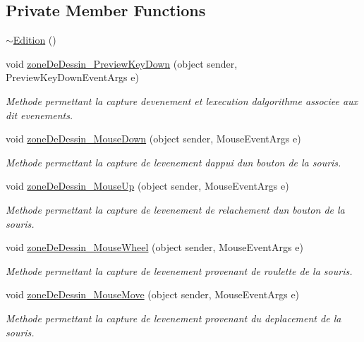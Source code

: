 \subsection*{Private Member Functions}
\begin{DoxyCompactItemize}
\item 
\hyperlink{group__inf2990_ga9d36af595cb96766209449c998fe42cd}{$\sim$\+Edition} ()
\item 
void \hyperlink{group__inf2990_ga994e6deaa6412757da4e495fb54c34bf}{zone\+De\+Dessin\+\_\+\+Preview\+Key\+Down} (object sender, Preview\+Key\+Down\+Event\+Args e)
\begin{DoxyCompactList}\small\item\em Methode permettant la capture d\textquotesingle{}evenement et l\textquotesingle{}execution d\textquotesingle{}algorithme associee aux dit evenements. \end{DoxyCompactList}\item 
void \hyperlink{group__inf2990_gaf28702ba0b8ace91adc0b787d679b482}{zone\+De\+Dessin\+\_\+\+Mouse\+Down} (object sender, Mouse\+Event\+Args e)
\begin{DoxyCompactList}\small\item\em Methode permettant la capture de l\textquotesingle{}evenement d\textquotesingle{}appui d\textquotesingle{}un bouton de la souris. \end{DoxyCompactList}\item 
void \hyperlink{group__inf2990_ga316904eb2e935ef2a5258e3a6bcfa572}{zone\+De\+Dessin\+\_\+\+Mouse\+Up} (object sender, Mouse\+Event\+Args e)
\begin{DoxyCompactList}\small\item\em Methode permettant la capture de l\textquotesingle{}evenement de relachement d\textquotesingle{}un bouton de la souris. \end{DoxyCompactList}\item 
void \hyperlink{group__inf2990_ga3a6b0beb5f842f149d46c6e85854d0b8}{zone\+De\+Dessin\+\_\+\+Mouse\+Wheel} (object sender, Mouse\+Event\+Args e)
\begin{DoxyCompactList}\small\item\em Methode permettant la capture de l\textquotesingle{}evenement provenant de roulette de la souris. \end{DoxyCompactList}\item 
void \hyperlink{group__inf2990_ga5934a8cc2a311d8d3323f9583e19963f}{zone\+De\+Dessin\+\_\+\+Mouse\+Move} (object sender, Mouse\+Event\+Args e)
\begin{DoxyCompactList}\small\item\em Methode permettant la capture de l\textquotesingle{}evenement provenant du deplacement de la souris. \end{DoxyCompactList}\item 

\end{DoxyCompactItemize}
